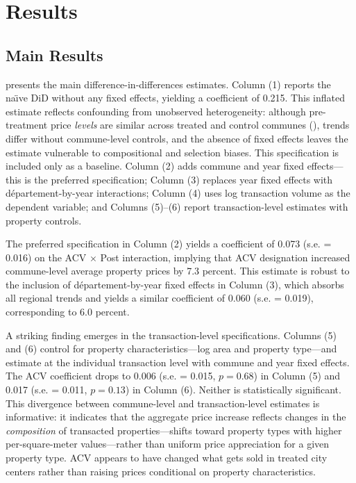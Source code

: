 \documentclass[12pt]{article}
\begin{document}
\section{Results}

\subsection{Main Results}

 presents the main difference-in-differences estimates. Column (1) reports the na\"{\i}ve DiD without any fixed effects, yielding a coefficient of 0.215. This inflated estimate reflects confounding from unobserved heterogeneity: although pre-treatment price \textit{levels} are similar across treated and control communes (), trends differ without commune-level controls, and the absence of fixed effects leaves the estimate vulnerable to compositional and selection biases. This specification is included only as a baseline. Column (2) adds commune and year fixed effects---this is the preferred specification; Column (3) replaces year fixed effects with d\'{e}partement-by-year interactions; Column (4) uses log transaction volume as the dependent variable; and Columns (5)--(6) report transaction-level estimates with property controls.

The preferred specification in Column (2) yields a coefficient of 0.073 (s.e. = 0.016) on the ACV $\times$ Post interaction, implying that ACV designation increased commune-level average property prices by 7.3 percent. This estimate is robust to the inclusion of d\'{e}partement-by-year fixed effects in Column (3), which absorbs all regional trends and yields a similar coefficient of 0.060 (s.e. = 0.019), corresponding to 6.0 percent.

A striking finding emerges in the transaction-level specifications. Columns (5) and (6) control for property characteristics---log area and property type---and estimate at the individual transaction level with commune and year fixed effects. The ACV coefficient drops to 0.006 (s.e. = 0.015, $p = 0.68$) in Column (5) and 0.017 (s.e. = 0.011, $p = 0.13$) in Column (6). Neither is statistically significant. This divergence between commune-level and transaction-level estimates is informative: it indicates that the aggregate price increase reflects changes in the \textit{composition} of transacted properties---shifts toward property types with higher per-square-meter values---rather than uniform price appreciation for a given property type. ACV appears to have changed what gets sold in treated city centers rather than raising prices conditional on property characteristics.
\end{document}
